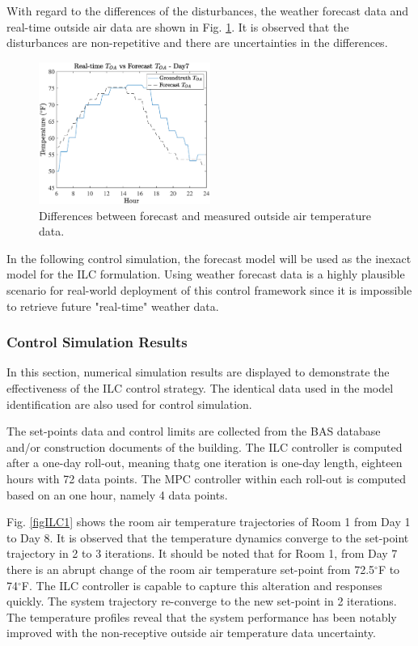 \documentclass[conference]{IEEEtran}
\begin{document}
With regard to the differences of the disturbances, the weather forecast data and real-time outside air data are shown in Fig. \ref{figOA}. It is observed that the disturbances are non-repetitive and there are uncertainties in the differences.

\begin{figure}[htbp]
\centerline{\includegraphics[width=0.5\textwidth]{Figures/oa_comp.eps}}
\caption{Differences between forecast and measured outside air temperature data.}
\label{figOA}
\end{figure}

In the following control simulation, the forecast model will be used as the inexact model for the ILC formulation. Using weather forecast data is a highly plausible scenario for real-world deployment of this control framework since it is impossible to retrieve future "real-time" weather data.

\subsubsection{Control Simulation Results}
In this section, numerical simulation results are displayed to demonstrate the effectiveness of the ILC control strategy. The identical data used in the model identification are also used for control simulation. 

The set-points data and control limits are collected from the BAS database and/or construction documents of the building. The ILC controller is computed after a one-day roll-out, meaning thatg one iteration is one-day length, eighteen hours with 72 data points. The MPC controller within each roll-out is computed based on an one hour, namely 4 data points.

Fig. \ref{figILC1} shows the room air temperature trajectories of Room 1 from Day 1 to Day 8. It is observed that the temperature dynamics converge to the set-point trajectory in 2 to 3 iterations. It should be noted that for Room 1, from Day 7 there is an abrupt change of the room air temperature set-point from 72.5$^\circ$F to 74$^\circ$F. The ILC controller is capable to capture this alteration and responses quickly. The system trajectory re-converge to the new set-point in 2 iterations. The temperature profiles reveal that the system performance has been notably improved with the non-receptive outside air temperature data uncertainty. 
\end{document}
